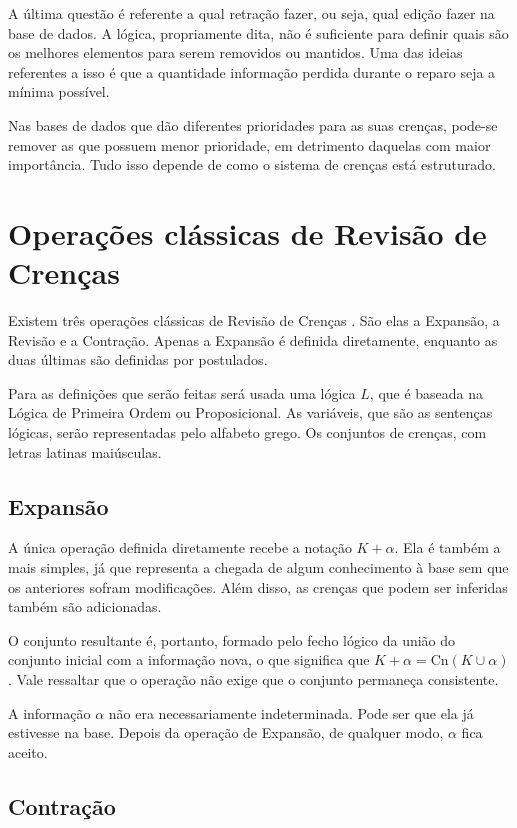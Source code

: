 A última questão é referente a qual retração fazer, ou seja, qual edição fazer na base de dados. A lógica, propriamente dita, não é suficiente para definir quais são os melhores elementos para serem removidos ou mantidos. Uma das ideias referentes a isso é que a quantidade informação perdida durante o reparo seja a mínima possível. 

Nas bases de dados que dão diferentes prioridades para as suas crenças, pode-se remover as que possuem menor prioridade, em detrimento daquelas com maior importância. Tudo isso depende de como o sistema de crenças está estruturado.

\section{Operações clássicas de Revisão de Crenças}

Existem três operações clássicas de Revisão de Crenças \citep{revisaoGardenfors3}. São elas a Expansão, a Revisão e a Contração. Apenas a Expansão é definida diretamente, enquanto as duas últimas são definidas por postulados. 

Para as definições que serão feitas será usada uma lógica $ L $, que é baseada na Lógica de Primeira Ordem ou Proposicional. As variáveis, que são as sentenças lógicas, serão representadas pelo alfabeto grego. Os conjuntos de crenças, com letras latinas maiúsculas.

\subsection{Expansão}

A única operação definida diretamente recebe a notação $ K + \alpha $. Ela é também a mais simples, já que representa a chegada de algum conhecimento à base sem que os anteriores sofram modificações. Além disso, as crenças que podem ser inferidas também são adicionadas.

O conjunto resultante é, portanto, formado pelo fecho lógico da união do conjunto inicial com a informação nova, o que significa que $ K + \alpha = \text{Cn}(K \cup \alpha) $. Vale ressaltar que o operação não exige que o conjunto permaneça consistente.

A informação $ \alpha $ não era necessariamente indeterminada. Pode ser que ela já estivesse na base. Depois da operação de Expansão, de qualquer modo, $ \alpha $ fica aceito.

\subsection{Contração}

